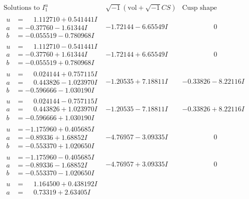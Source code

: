 \documentclass[1p]{elsarticle_modified}
\theoremstyle{definition}
\newcommand{\I}{\sqrt{-1}}
\begin{document}
$$\begin{array}{c|c|c}
\text{Solutions to }I^u_{1}& \I (\text{vol} + \sqrt{-1}CS) & \text{Cusp shape}\\
 \hline 
\begin{aligned}
u &= \phantom{-}1.112710 + 0.541441 I \\
a &= -0.37760 - 1.61344 I \\
b &= -0.055519 - 0.780968 I\end{aligned}
 & -1.72144 - 6.65549 I & \phantom{-0.000000 } 0 \\ \hline\begin{aligned}
u &= \phantom{-}1.112710 - 0.541441 I \\
a &= -0.37760 + 1.61344 I \\
b &= -0.055519 + 0.780968 I\end{aligned}
 & -1.72144 + 6.65549 I & \phantom{-0.000000 } 0 \\ \hline\begin{aligned}
u &= \phantom{-}0.024144 + 0.757115 I \\
a &= \phantom{-}0.443826 - 1.023970 I \\
b &= -0.596666 - 1.030190 I\end{aligned}
 & -1.20535 + 7.18811 I & -0.33826 - 8.22116 I \\ \hline\begin{aligned}
u &= \phantom{-}0.024144 - 0.757115 I \\
a &= \phantom{-}0.443826 + 1.023970 I \\
b &= -0.596666 + 1.030190 I\end{aligned}
 & -1.20535 - 7.18811 I & -0.33826 + 8.22116 I \\ \hline\begin{aligned}
u &= -1.175960 + 0.405685 I \\
a &= -0.89336 + 1.68852 I \\
b &= -0.553370 + 1.020650 I\end{aligned}
 & -4.76957 - 3.09335 I & \phantom{-0.000000 } 0 \\ \hline\begin{aligned}
u &= -1.175960 - 0.405685 I \\
a &= -0.89336 - 1.68852 I \\
b &= -0.553370 - 1.020650 I\end{aligned}
 & -4.76957 + 3.09335 I & \phantom{-0.000000 } 0 \\ \hline\begin{aligned}
u &= \phantom{-}1.164500 + 0.438192 I \\
a &= \phantom{-}0.73319 + 2.63405 I \\

\end{aligned}
\end{array}$$
\end{document}
